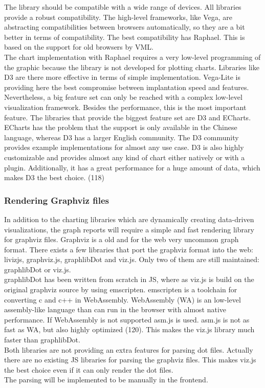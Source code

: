 \documentclass[american,a4paper,oneside,,tablecaptionabove]{scrbook}
\begin{document}
The library should be compatible with a wide range of devices. All
libraries provide a robust compatibility. The high-level frameworks,
like Vega, are abstracting compatibilities between browsers
automatically, so they are a bit better in terms of compatibility. The
best compatibility has Raphael. This is based on the support for old
browsers by VML.\\
The chart implementation with Raphael requires a very low-level
programming of the graphic because the library is not developed for
plotting charts. Libraries like D3 are there more effective in terms of
simple implementation. Vega-Lite is providing here the best compromise
between implantation speed and features.\\
Nevertheless, a big feature set can only be reached with a complex
low-level visualization framework. Besides the performance, this is the
most important feature. The libraries that provide the biggest feature
set are D3 and ECharts. ECharts has the problem that the support is only
available in the Chinese language, whereas D3 has a larger English
community. The D3 community provides example implementations for almost
any use case. D3 is also highly customizable and provides almost any
kind of chart either natively or with a plugin. Additionally, it has a
great performance for a huge amount of data, which makes D3 the best
choice. (118)

\subsubsection{Rendering Graphviz files}\label{rendering-graphviz-files}

In addition to the charting libraries which are dynamically creating
data-driven visualizations, the graph reports will require a simple and
fast rendering library for graphviz files. Graphviz is a old and for the
web very uncommon graph format. There exists a few libraries that port
the graphviz format into the web: livizjs, graphviz.js, graphlibDot and
viz.js. Only two of them are still maintained: graphlibDot or viz.js.\\
graphlibDot has been written from scratch in JS, where as viz.js is
build on the original graphviz source by using emscripten. emscripten is
a toolchain for converting c and c++ in WebAssembly. WebAssembly (WA) is
an low-level assembly-like language than can run in the browser with
almost native performance. If WebAssembly is not supported asm.js is
used. asm.js is not as fast as WA, but also highly optimized (120). This
makes the viz.js library much faster than graphlibDot.\\
Both libraries are not providing an extra features for parsing dot
files. Actually there are no existing JS libraries for parsing the
graphviz files. This makes viz.js the best choice even if it can only
render the dot files.\\
The parsing will be implemented to be manually in the frontend.
\end{document}
